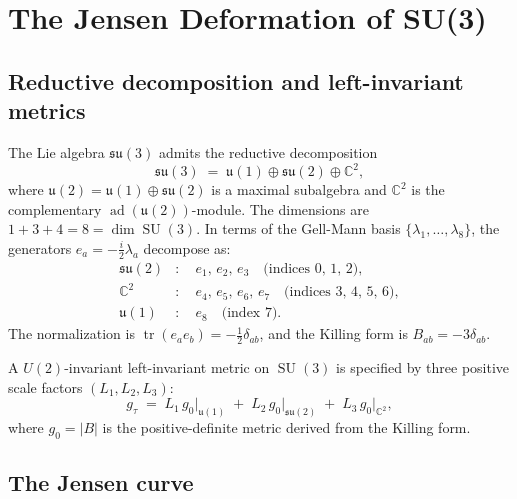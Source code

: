 \documentclass[12pt]{article}
\theoremstyle{definition}
\theoremstyle{remark}
\DeclareMathOperator{\tr}{tr}
\DeclareMathOperator{\SU}{SU}
\DeclareMathOperator{\ad}{ad}
\begin{document}
\section{The Jensen Deformation of SU(3)}\label{sec:jensen}

\subsection{Reductive decomposition and left-invariant metrics}

The Lie algebra $\mathfrak{su}(3)$ admits the reductive decomposition
\cite{Jensen1973, Baptista2024}
\begin{equation}\label{eq:reductive}
  \mathfrak{su}(3) \;=\; \mathfrak{u}(1) \oplus \mathfrak{su}(2)
  \oplus \mathbb{C}^2,
\end{equation}
where $\mathfrak{u}(2) = \mathfrak{u}(1) \oplus \mathfrak{su}(2)$ is a
maximal subalgebra and $\mathbb{C}^2$ is the complementary
$\ad(\mathfrak{u}(2))$-module.  The dimensions are
$1 + 3 + 4 = 8 = \dim\SU(3)$.  In terms of the Gell-Mann basis
$\{\lambda_1,\ldots,\lambda_8\}$, the generators $e_a = -\tfrac{i}{2}\lambda_a$
decompose as:
\begin{align}
  \mathfrak{su}(2) &:\quad e_1,\, e_2,\, e_3
    \quad\text{(indices 0, 1, 2)},\nonumber\\
  \mathbb{C}^2 &:\quad e_4,\, e_5,\, e_6,\, e_7
    \quad\text{(indices 3, 4, 5, 6)},\label{eq:decomp-indices}\\
  \mathfrak{u}(1) &:\quad e_8
    \quad\text{(index 7)}.\nonumber
\end{align}
The normalization is $\tr(e_a e_b) = -\tfrac{1}{2}\delta_{ab}$, and
the Killing form is $B_{ab} = -3\delta_{ab}$.

A $U(2)$-invariant left-invariant metric on $\SU(3)$ is specified by
three positive scale factors $(L_1, L_2, L_3)$:
\begin{equation}\label{eq:u2-metric}
  g_\tau \;=\; L_1\, g_0\big|_{\mathfrak{u}(1)}
  \;+\; L_2\, g_0\big|_{\mathfrak{su}(2)}
  \;+\; L_3\, g_0\big|_{\mathbb{C}^2},
\end{equation}
where $g_0 = |B|$ is the positive-definite metric derived from the
Killing form.


\subsection{The Jensen curve}
\end{document}
